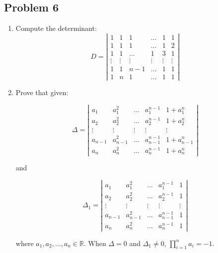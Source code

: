 \documentclass[11pt]{article}
\begin{document}
\subsection{Problem 6}
\label{sec:orgheadline14}
\begin{enumerate}
\item Compute the determinant:
\begin{equation*}
  D = \left|
    \begin{array}{lllrll}
      1      & 1      & 1      & \dots  & 1      & 1      \\
      1      & 1      & 1      & \dots  & 1      & 2      \\
      1      & 1      & \dots  & 1      & 3      & 1      \\
      \vdots & \vdots & \vdots & \vdots & \vdots & \vdots \\
      1      & 1      & n-1    & \dots  & 1      & 1      \\
      1      & n      & 1      & \dots  & 1      & 1
    \end{array}
  \right|
\end{equation*}

\item Prove that given:

\begin{equation*}
  \Delta = \left|
    \begin{array}{llllll}
      a_1    & a^2_1    & \dots  & a^{n-1}_1    & 1 + a^n_1    \\
      a_2    & a^2_2    & \dots  & a^{n-1}_2    & 1 + a^n_2    \\
      \vdots & \vdots  & \vdots & \vdots      & \vdots      \\
      a_{n-1} & a^2_{n-1} & \dots  & a^{n-1}_{n-1} & 1 + a^n_{n-1} \\
      a_n    & a^2_n    & \dots  & a^{n-1}_n    & 1 + a^n_n
    \end{array}
  \right|
\end{equation*}

and

\begin{equation*}
  \Delta_1 = \left|
    \begin{array}{llllll}
      a_1    & a^2_1    & \dots  & a^{n-1}_1    & 1      \\
      a_2    & a^2_2    & \dots  & a^{n-1}_2    & 1      \\
      \vdots & \vdots  & \vdots & \vdots      & \vdots \\
      a_{n-1} & a^2_{n-1} & \dots  & a^{n-1}_{n-1} & 1      \\
      a_n    & a^2_n    & \dots  & a^{n-1}_n    & 1
    \end{array}
  \right|
\end{equation*}

where \(a_1, a_2, \dots, a_n \in \mathbb{R}\).  When \(\Delta = 0\) and
\(\Delta_1 \neq 0\), \(\prod_{i=1}^n a_i = -1\).
\end{enumerate}
\end{document}
